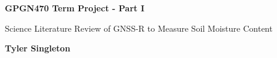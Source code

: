 \begin{center}
    \large
    \textbf{GPGN470 Term Project - Part I}
    
    \vspace{0.4cm}
    \large
    Science Literature Review of GNSS-R to Measure Soil Moisture Content
    
    \vspace{0.4cm}
    \textbf{Tyler Singleton}
    
    \vspace{0.9cm}
\end{center}